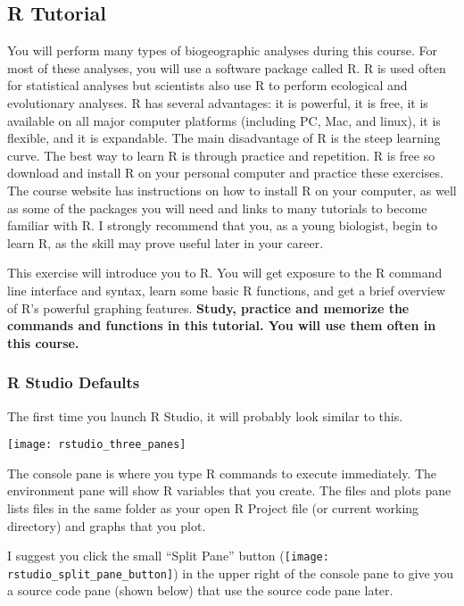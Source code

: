 \documentclass[11pt]{article}
\newcommand{\assignmentTitle}{R Tutorial}
\begin{document}
\thispagestyle{firstpage}

\subsection*{\assignmentTitle{}}

You will perform many types of biogeographic analyses during this
course. For most of these analyses, you will use a software package
called R. R is used often for statistical analyses but scientists also
use R to perform ecological and evolutionary analyses. R has several
advantages: it is powerful, it is free, it is available on all major
computer platforms (including PC, Mac, and linux), it is flexible, and
it is expandable. The main disadvantage of R is the steep learning
curve. The best way to learn R is through practice and repetition.
R is free so download and install R on your personal
computer and practice these exercises. The course website has
instructions on how to install R on your computer, as well as some of
the packages you will need and links to many tutorials to become
familiar with R. I strongly recommend that you, as a young biologist,
begin to learn R, as the skill may prove useful later in your career.

This exercise will introduce you to R. You will get exposure to the R
command line interface and syntax, learn some basic R functions, and get
a brief overview of R's powerful graphing features. \textbf{Study,
practice and memorize the commands and functions in this tutorial. You
will use them often in this course.}

\subsubsection*{R Studio Defaults}

The first time you launch R Studio, it will probably look similar to this.

\texttt{[image: rstudio\_three\_panes]}

The console pane is where you type R commands to execute immediately. The environment pane will show R variables that you create. The files and plots pane lists files in the same folder as your open R Project file (or current working directory) and graphs that you plot.

I suggest you click the small “Split Pane” button (\texttt{[image: rstudio\_split\_pane\_button]}) in the upper right of the console pane to give you a source code pane (shown below) that use the source code pane later.
\end{document}
